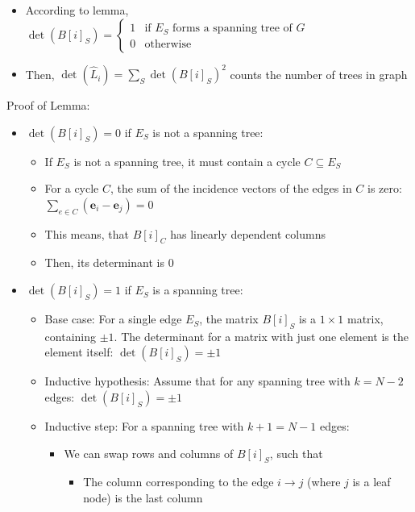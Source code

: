 \begin{itemize}
\begin{itemize}
        \item According to lemma, $
        \det(B[i]_S) =
        \begin{cases}
        1 & \text{if } E_S \text{ forms a spanning tree of } G \\
        0 & \text{otherwise}
        \end{cases}
        $
        \item Then, $ \det(\hat{L}_i) = \sum_S \det(B[i]_S)^2 $ counts the number of trees in graph
    \end{itemize}
\end{itemize}
Proof of Lemma:
\begin{itemize}
    \item $\det(B[i]_S) = 0 $ if $ E_S $ is not a spanning tree:
    \begin{itemize}
        \item If $ E_S $ is not a spanning tree, it must contain a cycle $ C \subseteq E_S $
        \item For a cycle $ C $, the sum of the incidence vectors of the edges in $ C $ is zero:
        $
        \sum_{e \in C} (\mathbf{e}_{i} - \mathbf{e}_{j}) = 0
        $
        \item This means, that $ B[i]_C $ has linearly dependent columns
        \item Then, its determinant is $0$
    \end{itemize}
    \item $\det(B[i]_S) = 1 $ if $ E_S $ is a spanning tree:
    \begin{itemize}
        \item Base case: For a single edge $ E_S $, the matrix $ B[i]_S $ is a $ 1 \times 1 $ matrix, containing $\pm 1$. The determinant for a matrix with just one element is the element itself:
        $
        \det(B[i]_S) = \pm 1
        $
        \item Inductive hypothesis: Assume that for any spanning tree with $ k = N-2 $ edges:
        $
        \det(B[i]_S) = \pm 1
        $
        \item Inductive step: For a spanning tree with $ k+1 = N-1 $ edges:
        \begin{itemize}
            \item We can swap rows and columns of $ B[i]_S $, such that 
            \begin{itemize}
                \item The column corresponding to the edge $ i \to j $ (where $ j $ is a leaf node) is the last column

\end{itemize}
\end{itemize}
\end{itemize}
\end{itemize}
